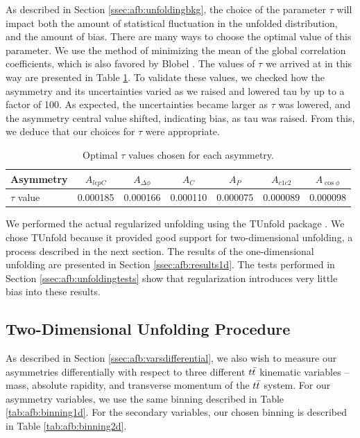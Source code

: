 As described in Section \ref{ssec:afb:unfoldingbkg}, the choice of the
parameter $\tau$ will impact both the amount of statistical
fluctuation in the unfolded distribution, and the amount of
bias. There are many ways to choose the optimal value of this parameter. We
use the method of minimizing the mean of the global correlation
coefficients, which is also favored by Blobel
\cite{blobelseminar}. The values of $\tau$ we arrived at in this way
are presented in Table \ref{tab:afb:tau1d}. To validate these values,
we checked how the asymmetry and its uncertainties varied as we raised
and lowered tau by up to a factor of 100. As expected, the
uncertainties became larger as $\tau$ was lowered, and the asymmetry %
central value shifted, indicating bias, as tau was raised. From this, we deduce
that our choices for $\tau$ were appropriate.

\begin{table}[htb]
\begin{center}
\caption{Optimal $\tau$ values chosen for each asymmetry.}
\label{tab:afb:tau1d}
\begin{tabular}{l | c  c  c  c  c  c }
\hline
Asymmetry & $A_{lepC}$ & $A_{\Delta\phi}$ & $A_{C}$ & $A_{P}$ & $A_{c1c2}$ & $A_{\cos\phi}$ \\ \hline
$\tau$ value & 0.000185 & 0.000166 & 0.000110 & 0.000075 & 0.000089 & 0.000098 \\ \hline
\end{tabular}
\end{center}
\end{table}

We performed the actual regularized unfolding using the TUnfold
package \cite{tunfold}. We chose TUnfold because it provided good
support for two-dimensional unfolding, a process described in the next
section. The results of the one-dimensional unfolding are presented in
Section \ref{ssec:afb:results1d}. The tests performed in Section
\ref{ssec:afb:unfoldingtests} show that regularization introduces very
little bias into these results.

\subsection{Two-Dimensional Unfolding Procedure}
\label{ssec:afb:unfolding2d}

As described in Section \ref{ssec:afb:varsdifferential}, we also wish
to measure our asymmetries differentially with respect to three
different $t\bar{t}$ kinematic variables -- mass, absolute rapidity, and transverse
momentum of the $t\bar{t}$ system. For our asymmetry variables, we use
the same binning described in Table \ref{tab:afb:binning1d}. For the
secondary variables, our chosen binning is described in Table
\ref{tab:afb:binning2d}.

